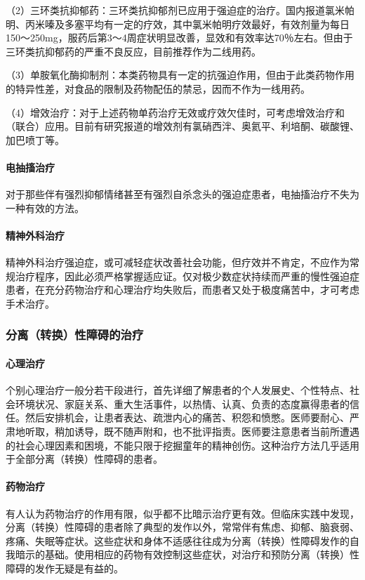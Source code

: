 （2）三环类抗抑郁药：三环类抗抑郁剂已应用于强迫症的治疗。国内报道氯米帕明、丙米嗪及多塞平均有一定的疗效，其中氯米帕明疗效最好，有效剂量为每日150～250mg，服药后第3～4周症状明显改善，显效和有效率达70％左右。但由于三环类抗抑郁药的严重不良反应，目前推荐作为二线用药。

（3）单胺氧化酶抑制剂：本类药物具有一定的抗强迫作用，但由于此类药物作用的特异性差，对食品的限制及药物配伍的禁忌，因而不作为一线用药。

（4）增效治疗：对于上述药物单药治疗无效或疗效欠佳时，可考虑增效治疗和（联合）应用。目前有研究报道的增效剂有氯硝西泮、奥氦平、利培酮、碳酸锂、加巴喷丁等。
\paragraph{电抽搐治疗}

对于那些伴有强烈抑郁情绪甚至有强烈自杀念头的强迫症患者，电抽搐治疗不失为一种有效的方法。
\paragraph{精神外科治疗}

精神外科治疗强迫症，或可减轻症状改善社会功能，但疗效并不肯定，不应作为常规治疗程序，因此必须严格掌握适应证。仅对极少数症状持续而严重的慢性强迫症患者，在充分药物治疗和心理治疗均失败后，而患者又处于极度痛苦中，才可考虑手术治疗。

\subsubsection{分离（转换）性障碍的治疗}
\paragraph{心理治疗}

个别心理治疗一般分若干段进行，首先详细了解患者的个人发展史、个性特点、社会环境状况、家庭关系、重大生活事件，以热情、认真、负责的态度赢得患者的信任。然后安排机会，让患者表达、疏泄内心的痛苦、积怨和愤憋。医师要耐心、严肃地听取，稍加诱导，既不随声附和，也不批评指责。医师要注意患者当前所遭遇的社会心理因素和困境，不能只限于挖掘童年的精神创伤。这种治疗方法几乎适用于全部分离（转换）性障碍的患者。
\paragraph{药物治疗}

有人认为药物治疗的作用有限，似乎都不比暗示治疗更有效。但临床实践中发现，分离（转换）性障碍的患者除了典型的发作以外，常常伴有焦虑、抑郁、脑衰弱、疼痛、失眠等症状。这些症状和身体不适感往往成为分离（转换）性障碍发作的自我暗示的基础。使用相应的药物有效控制这些症状，对治疗和预防分离（转换）性障碍的发作无疑是有益的。

